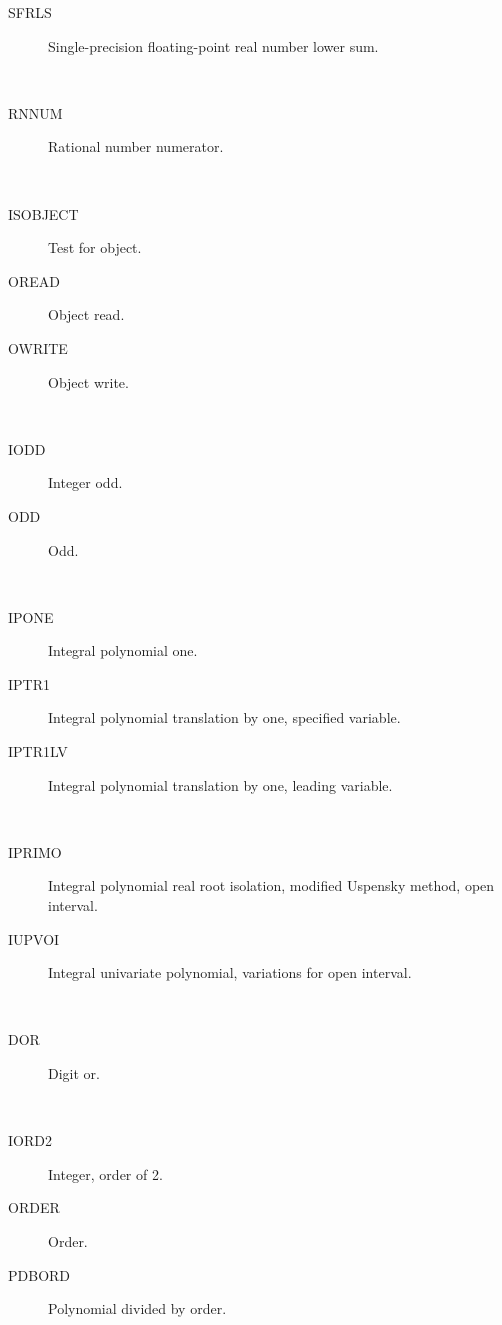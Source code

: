 \begin{description}
\begin{description}
  \item[SFRLS]  Single-precision floating-point real number lower sum.
  \end{description}
\item[numerator] \ \ 
  \begin{description}
  \item[RNNUM]  Rational number numerator.
  \end{description}
\item[object] \ \ 
  \begin{description}
  \item[ISOBJECT]  Test for object.
  \item[OREAD]  Object read.
  \item[OWRITE]  Object write.
  \end{description}
\item[odd] \ \ 
  \begin{description}
  \item[IODD]  Integer odd.
  \item[ODD]  Odd.
  \end{description}
\item[one] \ \ 
  \begin{description}
  \item[IPONE]  Integral polynomial one.
  \item[IPTR1]  Integral polynomial translation by one, specified variable.
  \item[IPTR1LV]  Integral polynomial translation by one, leading variable.
  \end{description}
\item[open] \ \ 
  \begin{description}
  \item[IPRIMO]  Integral polynomial real root isolation, modified Uspensky
    method, open interval.
  \item[IUPVOI]  Integral univariate polynomial, variations for open interval.
  \end{description}
\item[or] \ \ 
  \begin{description}
  \item[DOR]  Digit or.
  \end{description}
\item[order] \ \ 
  \begin{description}
  \item[IORD2]  Integer, order of 2.
  \item[ORDER]  Order.
  \item[PDBORD]  Polynomial divided by order.

\end{description}
\end{description}
